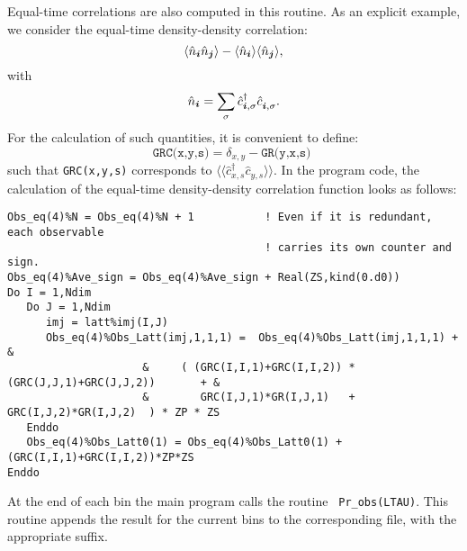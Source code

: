 Equal-time correlations  are also computed in this routine. As an explicit example, we  consider the equal-time density-density correlation:
\begin{equation}
	 \langle \hat{n}_{\boldsymbol{i}}   \hat{n}_{\boldsymbol{j}} \rangle   -  \langle \hat{n}_{\boldsymbol{i} }\rangle  \langle    \hat{n}_{\boldsymbol{j}}  \rangle,
\end{equation} 
with
\begin{equation}
	 \hat{n}_{\vec{i}}  =   \sum_{\sigma} \hat{c}^{\dagger}_{\ve{i},\sigma} \hat{c}^{\phantom\dagger}_{\ve{i},\sigma}.
\end{equation}
For the calculation of such quantities, it is convenient to  define: 
\begin{equation}
\label{GRC.eq}
	\texttt{GRC(x,y,s)}   =  \delta_{x,y}  - \texttt{GR(y,x,s)  }
\end{equation}
such that \texttt{GRC(x,y,s)}    corresponds to  $ \langle \langle  \hat{c}_{x,s}^{\dagger}\hat{c}_{y,s}^{\phantom\dagger} \rangle \rangle $. 
In the program code, the calculation of the equal-time density-density correlation function looks as follows:
\begin{lstlisting}[style=fortran]
Obs_eq(4)%N = Obs_eq(4)%N + 1           ! Even if it is redundant, each observable  
                                        ! carries its own counter and sign.
Obs_eq(4)%Ave_sign = Obs_eq(4)%Ave_sign + Real(ZS,kind(0.d0))  
Do I = 1,Ndim
   Do J = 1,Ndim                       
      imj = latt%imj(I,J)
      Obs_eq(4)%Obs_Latt(imj,1,1,1) =  Obs_eq(4)%Obs_Latt(imj,1,1,1) + &
                     &     ( (GRC(I,I,1)+GRC(I,I,2)) * (GRC(J,J,1)+GRC(J,J,2))       + &
                     &        GRC(I,J,1)*GR(I,J,1)   +  GRC(I,J,2)*GR(I,J,2)  ) * ZP * ZS 
   Enddo
   Obs_eq(4)%Obs_Latt0(1) = Obs_eq(4)%Obs_Latt0(1) + (GRC(I,I,1)+GRC(I,I,2))*ZP*ZS
Enddo
\end{lstlisting} 
At the end of each bin the main program calls the routine \texttt{ Pr\_obs(LTAU)}. This routine appends the result for the current bins to the corresponding file, with the appropriate suffix. 

